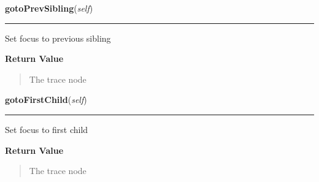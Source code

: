    \label{tracetool:TraceNode:gotoPrevSibling}

    \vspace{0.5ex}

\hspace{.8\funcindent}\begin{boxedminipage}{\funcwidth}

    \raggedright \textbf{gotoPrevSibling}(\textit{self})

    \vspace{-1.5ex}

    \rule{\textwidth}{0.5\fboxrule}
\setlength{\parskip}{2ex}
    Set focus to previous sibling

\setlength{\parskip}{1ex}
      \textbf{Return Value}
    \vspace{-1ex}

      \begin{quote}
      The trace node

      \end{quote}

    \end{boxedminipage}

    \label{tracetool:TraceNode:gotoFirstChild}

    \vspace{0.5ex}

\hspace{.8\funcindent}\begin{boxedminipage}{\funcwidth}

    \raggedright \textbf{gotoFirstChild}(\textit{self})

    \vspace{-1.5ex}

    \rule{\textwidth}{0.5\fboxrule}
\setlength{\parskip}{2ex}
    Set focus to first child

\setlength{\parskip}{1ex}
      \textbf{Return Value}
    \vspace{-1ex}

      \begin{quote}
      The trace node

      \end{quote}

    \end{boxedminipage}

